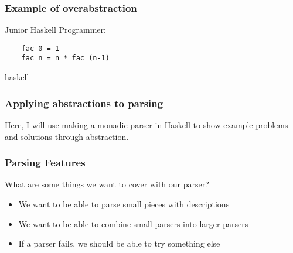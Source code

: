 \documentclass{beamer}
\begin{document}
\begin{frame}
  \frametitle{Example of overabstraction}

  Junior Haskell Programmer:

  \begin{verbatim}
    fac 0 = 1
    fac n = n * fac (n-1)
  \end{verbatim}{haskell}








\end{frame}


\begin{frame}
  \frametitle{Applying abstractions to parsing}

  Here, I will use making a monadic parser in Haskell
  to show example problems and solutions through abstraction.
\end{frame}


\begin{frame}
  \frametitle{Parsing Features}

  What are some things we want to cover with our parser?
  \begin{itemize}
    \item We want to be able to parse small pieces with descriptions
    \item We want to be able to combine small parsers into larger parsers
    \item If a parser fails, we should be able to try something else
  \end{itemize}

\end{frame}
\end{document}
